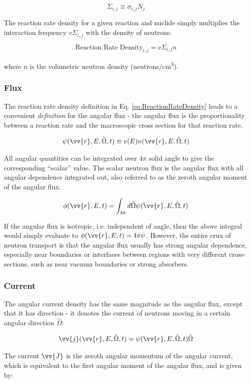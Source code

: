 \documentclass[10pt]{article}
\newcommand{\beq}{\begin{equation}}
\newcommand{\eeq}{\end{equation}}
\newcommand{\hO}{\hat{\Omega}}
\newcommand{\spa}{(\vv{r}, E, \hO, t)}
\begin{document}
\begin{flushleft}
\beq
\Sigma_{i,j}\equiv\sigma_{i,j}N_j
\eeq

The reaction rate density for a given reaction and nuclide simply multiplies the interaction frequency \(v\Sigma_{i,j}\) with the density of neutrons:

\beq
\label{eq:ReactionRateDensity}
\textrm{Reaction Rate Density}_{i,j} = v\Sigma_{i,j}n
\eeq

where \(n\) is the volumetric neutron density (neutrons/cm\textsuperscript{3}). 

\subsubsection{Flux}

The reaction rate density definition in Eq. \ref{eq:ReactionRateDensity} leads to a convenient \textit{definition} for the angular flux - the angular flux is the proportionality between a reaction rate and the macroscopic cross section for that reaction rate.

\beq
\label{eq:AngularFlux}
\psi\spa \equiv v(E)n\spa
\eeq

All angular quantities can be integrated over \(4\pi\) solid angle to give the corresponding ``scalar'' value. The scalar neutron flux is the angular flux with all angular dependence integrated out, also referred to as the zeroth angular moment of the angular flux.

\beq
\label{eq:ScalarFlux}
\phi(\vv{r}, E, t) = \int_{4\pi}^{} d\hO\psi\spa
\eeq

If the angular flux is isotropic, i.e. independent of angle, then the above integral would simply evaluate to \(\phi(\vv{r}, E, t)=4\pi\psi\). However, the entire crux of neutron transport is that the angular flux usually has strong angular dependence, especially near boundaries or interfaces between regions with very different cross-sections, such as near vacuum boundaries or strong absorbers. 

\subsubsection{Current}

The angular current density has the same magnitude as the angular flux, except that it has direction - it denotes the current of neutrons moving in a certain angular direction \(\hO\):

\beq
\label{eq:AngularCurrent}
\vv{j}\spa = \psi\spa\hO  
\eeq

The current \(\vv{J}\) is the zeroth angular momentum of the angular current, which is equivalent to the first angular moment of the angular flux, and is given by:


\end{flushleft}
\end{document}
